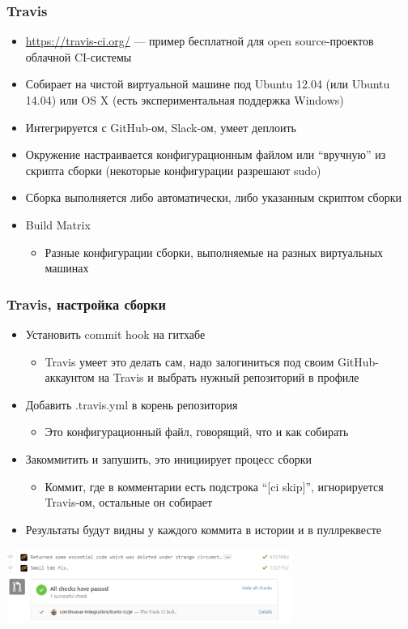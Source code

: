 \documentclass[xetex,mathserif,serif]{beamer}
\begin{document}
	\begin{frame}
		\frametitle{Travis}
		\begin{itemize}
			\item \url{https://travis-ci.org/} --- пример бесплатной для open source-проектов облачной CI-системы
			\item Собирает на чистой виртуальной машине под Ubuntu 12.04 (или Ubuntu 14.04) или OS X (есть экспериментальная поддержка Windows)
			\item Интегрируется с GitHub-ом, Slack-ом, умеет деплоить
			\item Окружение настраивается конфигурационным файлом или ``вручную'' из скрипта сборки (некоторые конфигурации разрешают sudo)
			\item Сборка выполняется либо автоматически, либо указанным скриптом сборки
			\item Build Matrix
			\begin{itemize}
				\item Разные конфигурации сборки, выполняемые на разных виртуальных машинах
			\end{itemize}
		\end{itemize}
	\end{frame}

	\begin{frame}
		\frametitle{Travis, настройка сборки}
		\begin{itemize}
			\item Установить commit hook на гитхабе
			\begin{itemize}
				\item Travis умеет это делать сам, надо залогиниться под своим GitHub-аккаунтом на Travis и выбрать нужный репозиторий в профиле
			\end{itemize}
			\item Добавить .travis.yml в корень репозитория
			\begin{itemize}
				\item Это конфигурационный файл, говорящий, что и как собирать
			\end{itemize}
			\item Закоммитить и запушить, это инициирует процесс сборки
			\begin{itemize}
				\item Коммит, где в комментарии есть подстрока ``[ci skip]'', игнорируется Travis-ом, остальные он собирает
			\end{itemize}
			\item Результаты будут видны у каждого коммита в истории и в пуллреквесте
		\end{itemize}
		\begin{center}
			\includegraphics[width=0.7\textwidth]{travisSuccess.png}
		\end{center}
	\end{frame}
\end{document}
